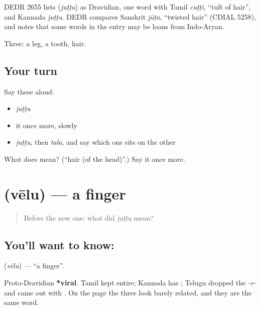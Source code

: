 \begin{cousinweb}
DEDR 2655 lists \textbf{} (\emph{juṭṭu}) as Dravidian, one word with Tamil \emph{cuṭṭi}, \textquotedblleft{}tuft of hair\textquotedblright{}, and Kannada \emph{juṭṭu}. DEDR compares Sanskrit \emph{jūṭa}, \textquotedblleft{}twisted hair\textquotedblright{} (CDIAL 5258), and notes that some words in the entry may be loans from Indo-Aryan.
\end{cousinweb}

\begin{grammarlens}[title={What you've built}]
Three: a leg, a tooth, hair.
\end{grammarlens}

\subsection*{Your turn}
Say these aloud:

\begin{itemize}
\raggedright
  \item \emph{juṭṭu}
  \item it once more, slowly
  \item \emph{juṭṭu}, then \emph{tala}, and say which one sits on the other
\end{itemize}

\begin{tcolorbox}[breakable,colback=teal!4,colframe=teal!35!black,title={Before you move on}]
What does  mean? (\textquotedblleft{}hair (of the head)\textquotedblright{}.) Say it once more.
\end{tcolorbox}
\section[\texorpdfstring{\te{వేలు} (vēlu)}{వేలు (vēlu)}]{ (vēlu) — a finger}

\label{lesson:TE-C47-finger}



\begin{quote}
Before the new one: what did \emph{juṭṭu} mean?
\end{quote}

\subsection*{You'll want to know: }
\textbf{} (\emph{vēlu}) — \textquotedblleft{}a finger\textquotedblright{}.

Proto-Dravidian \textbf{*viral}. Tamil kept  entire; Kannada has ; Telugu dropped the \emph{-r-} and came out with . On the page the three look barely related, and they are the same word.


